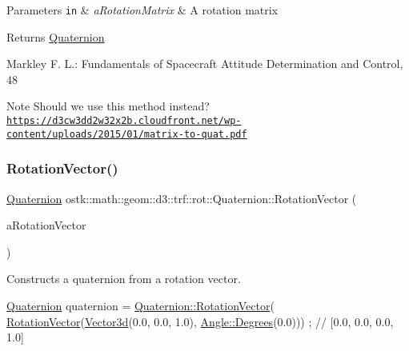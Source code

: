 \begin{DoxyParams}[1]{Parameters}
\mbox{\tt in}  & {\em a\+Rotation\+Matrix} & A rotation matrix \\
\hline
\end{DoxyParams}
\begin{DoxyReturn}{Returns}
\hyperlink{classostk_1_1math_1_1geom_1_1d3_1_1trf_1_1rot_1_1_quaternion}{Quaternion} 
\end{DoxyReturn}
Markley F. L.\+: Fundamentals of Spacecraft Attitude Determination and Control, 48 \begin{DoxyNote}{Note}
Should we use this method instead? \href{https://d3cw3dd2w32x2b.cloudfront.net/wp-content/uploads/2015/01/matrix-to-quat.pdf}{\tt https\+://d3cw3dd2w32x2b.\+cloudfront.\+net/wp-\/content/uploads/2015/01/matrix-\/to-\/quat.\+pdf} 
\end{DoxyNote}
\mbox{\label{classostk_1_1math_1_1geom_1_1d3_1_1trf_1_1rot_1_1_quaternion_aa5d053db4429218243bef0ed8967a4e7}} 
\subsubsection{\texorpdfstring{Rotation\+Vector()}{RotationVector()}}
{\footnotesize\ttfamily \hyperlink{classostk_1_1math_1_1geom_1_1d3_1_1trf_1_1rot_1_1_quaternion}{Quaternion} ostk\+::math\+::geom\+::d3\+::trf\+::rot\+::\+Quaternion\+::\+Rotation\+Vector (\begin{DoxyParamCaption}\item[{const \hyperlink{classostk_1_1math_1_1geom_1_1d3_1_1trf_1_1rot_1_1_rotation_vector}{rot\+::\+Rotation\+Vector} \&}]{a\+Rotation\+Vector }\end{DoxyParamCaption})\hspace{0.3cm}{\ttfamily [static]}}



Constructs a quaternion from a rotation vector. 


\begin{DoxyCode}
\hyperlink{classostk_1_1math_1_1geom_1_1d3_1_1trf_1_1rot_1_1_quaternion_ad9fd7d8eb5effb4d4e0394bbb5bb86dc}{Quaternion} quaternion = \hyperlink{classostk_1_1math_1_1geom_1_1d3_1_1trf_1_1rot_1_1_quaternion_aa5d053db4429218243bef0ed8967a4e7}{Quaternion::RotationVector}(
      \hyperlink{classostk_1_1math_1_1geom_1_1d3_1_1trf_1_1rot_1_1_quaternion_aa5d053db4429218243bef0ed8967a4e7}{RotationVector}(\hyperlink{namespaceostk_1_1math_1_1obj_a18744cbf433bce59f6758d9fe3b1dff1}{Vector3d}(0.0, 0.0, 1.0), \hyperlink{classostk_1_1math_1_1geom_1_1_angle_a2cefda601167af07f61f0477776203ca}{Angle::Degrees}(0.0))) ; \textcolor{comment}{//
       [0.0, 0.0, 0.0, 1.0]}
\end{DoxyCode}



